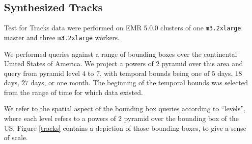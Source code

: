 \subsection{Synthesized Tracks}

Test for Tracks data were performed on EMR 5.0.0 clusters of one \texttt{m3.2xlarge} master and three \texttt{m3.2xlarge} workers.

We performed queries against a range of bounding boxes over the continental United States of America.
We project a powers of $2$ pyramid over this area and query from pyramid level $4$ to $7$,
with temporal bounds being one of $5$ days, $18$ days, $27$ days, or one month.
The beginning of the temporal bounds was selected from the range of time for which data existed.

We refer to the spatial aspect of the bounding box queries according to ``levels'',
where each level refers to a powers of $2$ pyramid over the bounding box of the US.
Figure \ref{tracks} contains a depiction of those bounding boxes, to give a sense of scale.

